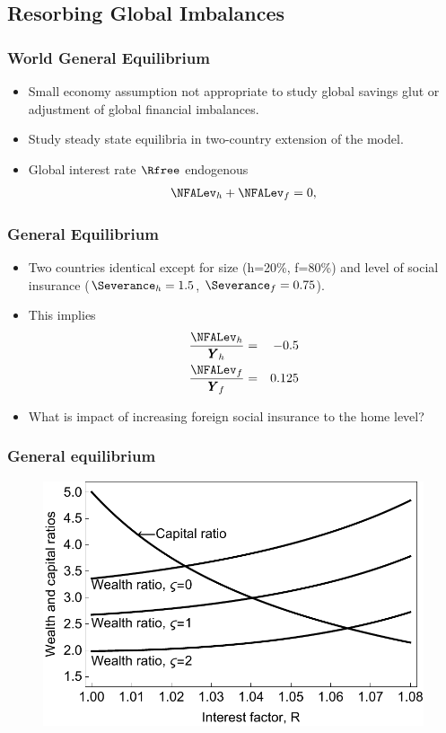 \documentclass{beamer}
\renewcommand{\GDPLev}{\ensuremath{\pmb{Y}}}
\begin{document}
\subsection{Resorbing Global Imbalances}
\begin{frame}
\frametitle{World General Equilibrium}
    \begin{itemize}
    \item Small economy assumption not appropriate to study global savings glut or adjustment of global financial imbalances. 
    \item Study steady state equilibria in two-country extension of the model.
    \item Global interest rate $\Rfree$ endogenous
\begin{eqnarray}
\NFALev_h+\NFALev_f=0,
\end{eqnarray}
    \end{itemize}

\end{frame}

\begin{frame}
\frametitle{General Equilibrium}
    \begin{itemize}
    \item Two countries identical except for size (h=20\%, f=80\%) and level of social insurance ($\Severance_h=1.5$, $\Severance_f=0.75$).
    \item This implies
    \begin{eqnarray}
    \frac{\NFALev_h}{\GDPLev_h}&=&-0.5 \\
    \frac{\NFALev_f}{\GDPLev_f}&=&0.125
    \end{eqnarray}
    \item What is impact of increasing foreign social insurance to the home level?
    \end{itemize}
\end{frame}


\begin{frame}
\frametitle{General equilibrium}
    \begin{figure}
    \centering
    \includegraphics[width=.55\textwidth]{../figures/geneqbm.pdf}
    \end{figure}
\end{frame}
\end{document}
